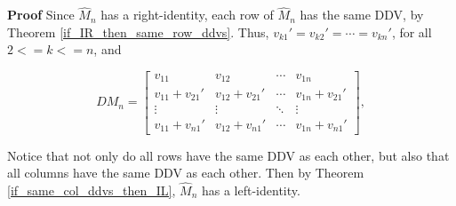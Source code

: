 \documentclass[10pt,letterpaper]{article}
\newenvironment{proof}{\noindent\textbf{Proof} }{\qed \newline}
\newcommand{\qed}{\nobreak \ifvmode \relax \else
      \ifdim\lastskip<1.5em \hskip-\lastskip
      \hskip1.5em plus0em minus0.5em \fi \nobreak
      \vrule height0.75em width0.5em depth0.25em\fi}
\numberwithin{equation}{section}
\begin{document}
\begin{proof}
Since $\hat M_n$ has a right-identity, each row of $\hat M_n$ has
the same DDV, by Theorem \ref{if_IR_then_same_row_ddvs}.  Thus,
$v_{k1} \prime = v_{k2} \prime = \cdots = v_{kn} \prime$, for all $2 <= k <=
n$, and

\[ DM_n = \left[ \begin{matrix} 
  v_{11} & v_{12} & \cdots & v_{1n} \\
  v_{11} + v_{21} \prime & v_{12} + v_{21} \prime & \cdots & v_{1n} + v_{21} \prime \\
  \vdots & \vdots & \ddots & \vdots \\
  v_{11} + v_{n1} \prime & v_{12} + v_{n1} \prime & \cdots & v_{1n} + v_{n1} \prime
 \end{matrix} \right] , \]

Notice that not only do all rows have the same DDV as each other,
but also that all columns have the same DDV as each other.  Then by Theorem
\ref{if_same_col_ddvs_then_IL}, $\hat M_n$ has a left-identity.\end{proof}
\end{document}

